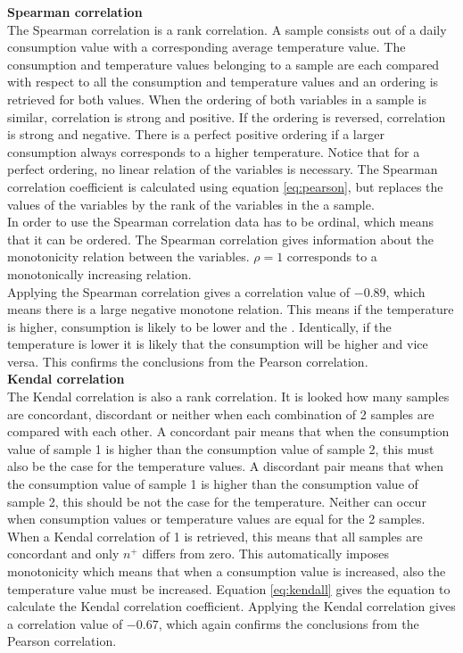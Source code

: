 \textbf{Spearman correlation}\\
The Spearman correlation is a rank correlation. A sample consists out of a daily consumption value with a corresponding average temperature value.
The consumption and temperature values belonging to a sample are each compared with respect to all the consumption and temperature values and an ordering is retrieved for both values. When the ordering of both variables in a sample is similar, correlation is strong and positive. If the ordering is reversed, correlation is strong and negative. There is a perfect positive ordering if a larger consumption always corresponds to a higher temperature. Notice that for a perfect ordering, no linear relation of the variables is necessary. The Spearman correlation coefficient is calculated using equation \ref{eq:pearson}, but replaces the values of the variables by the rank of the variables in the a sample.\\

In order to use the Spearman correlation data has to be ordinal, which means that it can be ordered. The Spearman correlation gives information about the monotonicity relation between the variables. $ \rho = 1 $ corresponds to a monotonically increasing relation.\\

Applying the Spearman correlation  gives a correlation value of $ -0.89$, which means there is a large negative monotone relation. This means if the temperature is higher, consumption is likely to be lower and the . Identically, if the temperature is lower it is likely that the consumption will be higher and vice versa. This confirms the conclusions from the Pearson correlation.\\

\textbf{Kendal correlation}\\
The Kendal correlation is also a rank correlation. It is looked how many samples are concordant, discordant or neither when each combination of 2 samples are compared with each other. A concordant pair means that when the consumption value of sample 1 is higher than the consumption value of sample 2, this must also be the case for the temperature values. A discordant pair means that when the consumption value of sample 1 is higher than the consumption value of sample 2, this should be not the case for the temperature. Neither can occur when consumption values or temperature values are equal for the 2 samples. When a Kendal correlation of 1 is retrieved, this means that all samples are concordant and only $ n^+ $ differs from zero. This automatically imposes monotonicity which means that when a consumption value is increased, also the temperature value must be increased. Equation \ref{eq:kendall} gives the equation to calculate the Kendal correlation coefficient. Applying the Kendal correlation  gives a correlation value of $ -0.67$, which again confirms the conclusions from the Pearson correlation.\\

